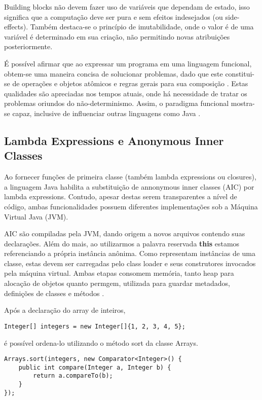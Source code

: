 \documentclass[10pt, conference]{IEEEtran}
\begin{document}
Building blocks não devem fazer uso de variáveis que dependam de estado, isso significa que a computação deve ser pura e sem efeitos indesejados (ou side-effects). Também destaca-se o princípio de imutabilidade, onde o valor é de uma variável é determinado em sua criação, não permitindo novas atribuições posteriormente.

É possível afirmar que ao expressar um programa em uma linguagem funcional, obtem-se uma maneira concisa de solucionar problemas, dado que este constitui-se de operações e objetos atômicos e regras gerais para sua composição \cite{michaelson2011introduction}. Estas qualidades são apreciadas nos tempos atuais, onde há necessidade de tratar os problemas oriundos do não-determinismo. Assim, o paradigma funcional mostra-se capaz, inclusive de influenciar outras linguagens como Java \cite{jsr335}.

\subsection{Lambda Expressions e Anonymous Inner Classes}
Ao fornecer funções de primeira classe (também lambda expressions ou closures), a linguagem Java habilita a substituição de annonymous inner classes (AIC) por lambda expressions. Contudo, apesar destas serem transparentes a nível de código, ambas funcionalidades possuem diferentes implementações sob a Máquina Virtual Java (JVM).

AIC são compiladas pela JVM, dando origem a novos arquivos contendo suas declarações. Além do mais, ao utilizarmos a palavra reservada \textbf{this} estamos referenciando a própria instância anônima. Como representam instâncias de uma classe, estas devem ser carregadas pelo class loader e seus construtores invocados pela máquina virtual. Ambas etapas consomem memória, tanto heap para alocação de objetos quanto permgem, utilizada para guardar metadados, definições de classes e métodos \cite{hunt2011java}.

Após a declaração do array de inteiros,

\begin{lstlisting}[caption={Array de Inteiros}]
Integer[] integers = new Integer[]{1, 2, 3, 4, 5};
\end{lstlisting}

é possível ordena-lo utilizando o método sort da classe Arrays.

\begin{lstlisting}[caption={Sort - Anonymous Inner Class}, label={lst:array-aic-sort}]
Arrays.sort(integers, new Comparator<Integer>() {
    public int compare(Integer a, Integer b) {
        return a.compareTo(b);
    }
});
\end{lstlisting}
\end{document}
